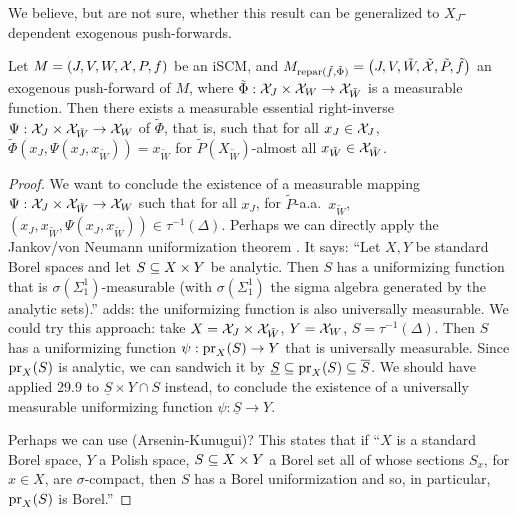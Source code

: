 We believe, but are not sure, whether this result can be generalized to $X_J$-dependent exogenous push-forwards.
\begin{Con}
  Let $M = \left ( J, V, W, \mathcal{X}, P, f \right )$ be an iSCM, and $M_{\mathrm{repar}({\tilde{f}},{\tilde{\Phi}})} = \left ( J, V, \tilde{W}, \tilde{\mathcal{X}}, \tilde{P}, \tilde{f} \right )$ an exogenous push-forward of $M$, where $\tilde\Phi : \mathcal{X}_J \times \mathcal{X}_W \to \mathcal{X}_{\tilde{W}}$ is a measurable function.
  Then there exists a measurable essential right-inverse $\Psi : \mathcal{X}_J \times \mathcal{X}_{\tilde{W}} \to \mathcal{X}_W$ of $\tilde\Phi$, that is, such that for all $x_J \in \mathcal{X}_J$,
  $\tilde{\Phi}(x_J,\Psi(x_J,x_{\tilde{W}})) = x_{\tilde{W}}$ for $\tilde P(X_{\tilde{W}})$-almost all $x_{\tilde{W}} \in \mathcal{X}_{\tilde{W}}$.
\end{Con}
\begin{proof}
We want to conclude the existence of a measurable mapping $\Psi : \mathcal{X}_J \times \mathcal{X}_{\tilde{W}} \to \mathcal{X}_W$ such that for all $x_J$, for $\tilde P$-a.a.\ $x_{\tilde{W}}$, $(x_J,x_{\tilde{W}},\Psi(x_J,x_{\tilde{W}})) \in \tau^{-1}(\Delta)$.
Perhaps we can directly apply the Jankov/von Neumann uniformization theorem \cite[Theorem 18.1]{Kec95}.
It says: ``Let $X,Y$ be standard Borel spaces and let $S \subseteq X \times Y$ be analytic. Then $S$ has a uniformizing function that is $\sigma(\Sigma_1^1)$-measurable (with $\sigma(\Sigma_1^1)$ the sigma algebra generated by the analytic sets).''
\cite[Theorem 29.9]{Kec95} adds: the uniformizing function is also universally measurable.
We could try this approach: take $X = \mathcal{X}_J \times \mathcal{X}_{\tilde{W}}$, $Y = \mathcal{X}_W$, $S = \tau^{-1}(\Delta)$.
Then $S$ has a uniformizing function $\psi : \mathrm{pr}_X(S) \to Y$ that is universally measurable.
Since $\mathrm{pr}_X(S)$ is analytic, we can sandwich it by $\underline{S} \subseteq \mathrm{pr}_X(S) \subseteq \overline{S}$.
We should have applied 29.9 to $\underline{S} \times Y \cap S$ instead, to conclude the existence of a universally measurable uniformizing function $\psi : \underline{S} \to Y$.

Perhaps we can use \cite[Theorem 35.46]{Kec95} (Arsenin-Kunugui)? This states that if
  ``$X$ is a standard Borel space, $Y$ a Polish space, $S \subseteq X \times Y$ a Borel set all of whose sections $S_x$, for $x \in X$, are $\sigma$-compact, then $S$ has a Borel uniformization and so, in particular, $\mathrm{pr}_X(S)$ is Borel.''
\end{proof}

